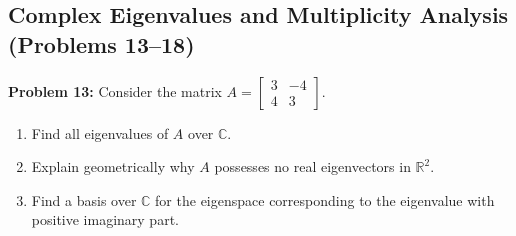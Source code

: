 \documentclass[11pt, letterpaper]{article}
\theoremstyle{definition}
\theoremstyle{remark}
\begin{document}
\subsection{Complex Eigenvalues and Multiplicity Analysis (Problems 13--18)}

\textbf{Problem 13:}
Consider the matrix $A = \begin{bmatrix} 3 & -4 \\ 4 & 3 \end{bmatrix}$.
\begin{enumerate}[label=(\alph*)]
    \item Find all eigenvalues of $A$ over $\mathbb{C}$.
    \item Explain geometrically why $A$ possesses no real eigenvectors in $\mathbb{R}^2$.
    \item Find a basis over $\mathbb{C}$ for the eigenspace corresponding to the eigenvalue with positive imaginary part.
\end{enumerate}
\end{document}
